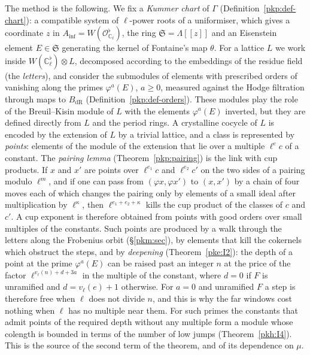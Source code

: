 \documentclass[10pt]{amsart}
\theoremstyle{definition}
\theoremstyle{remark}
\begin{document}
The method is the following. We fix a \emph{Kummer chart} of $\Gamma$
(Definition~\ref{pkp:def-chart}): a compatible system of $\ell$-power roots of a uniformiser,
which gives a coordinate $z$ in $A_{\mathrm{inf}}=W(\mathcal O_{\mathbb C_\ell}^\flat)$, the ring
$\mathfrak S=\Lambda[[z]]$ and an Eisenstein element $E\in\mathfrak S$ generating the kernel of
Fontaine's map $\theta$. For a lattice $L$ we work inside $W(\mathbb C_\ell^\flat)\otimes L$,
decomposed according to the embeddings of the residue field (the \emph{letters}), and consider
the submodules of elements with prescribed orders of vanishing along the primes
$\varphi^a(E)$, $a\ge0$, measured against the Hodge filtration through maps to
$B_{\mathrm{dR}}$ (Definition~\ref{pkp:def-orders}). These modules play the role of the
Breuil--Kisin module of $L$ with the elements $\varphi^a(E)$ inverted, but they are defined
directly from $L$ and the period rings. A
crystalline cocycle of $L$ is encoded by the extension of $L$ by a trivial lattice, and a class is
represented by \emph{points}: elements of the module of the extension that lie over a multiple
$\ell^ec$ of a constant. The \emph{pairing lemma} (Theorem~\ref{pkp:pairing}) is the link with cup
products. If $x$ and $x'$ are points over $\ell^{e_1}c$ and $\ell^{e_2}c'$ on the two sides of a
pairing modulo $\ell^m$, and if one can pass from $(\varphi x,\varphi x')$ to $(x,x')$ by a chain
of four moves each of which changes the pairing only by elements of a small ideal after
multiplication by $\ell^\kappa$, then $\ell^{e_1+e_2+\kappa}$ kills the cup product of the classes
of $c$ and $c'$. A cup exponent is therefore obtained from points with good orders over small
multiples of the constants. Such points are produced by a walk through the letters along the
Frobenius orbit (\S\ref{pkm:sec}), by elements that kill the cokernels which obstruct the steps,
and by \emph{deepening} (Theorem~\ref{pke:I2}): the depth of a point at the prime $\varphi^a(E)$
can be raised past an integer $n$ at the price of the factor $\ell^{v_\ell(n)+d+3a}$ in the
multiple of the constant, where $d=0$ if $F$ is unramified and $d=v_\ell(e)+1$ otherwise. For
$a=0$ and unramified $F$ a step is therefore free when $\ell$ does not divide $n$, and this is why
the far windows cost nothing when $\ell$ has no multiple near them. For such primes the constants
that admit points of the required depth without any multiple form a module whose colength is
bounded in terms of the number of low jumps (Theorem~\ref{pkh:I4}). This is the source of the
second term of the theorem, and of its dependence on $\mu$.
\end{document}
